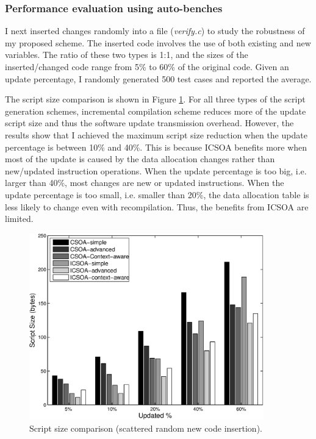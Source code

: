 \subsubsection{Performance evaluation using auto-benches}
I next inserted changes randomly into a file ({\em verify.c}) to study the robustness of my proposed scheme. The inserted code involves the use of both existing and new variables. The ratio of these two types is 1:1, and the sizes of the inserted/changed code range from 5\% to 60\% of the original code. Given an update percentage, I randomly generated 500 test cases and reported the average.

The script size comparison is shown in Figure \ref{upd_rand_bar}. For all three types of the script generation schemes, incremental compilation scheme reduces more of the
update script size and thus the software update transmission overhead. However, the results show that I achieved the maximum script size reduction when the update percentage is between 10\% and 40\%. This is because ICSOA benefits more when most of the update is caused by the data allocation changes rather than new/updated instruction operations. When the update percentage is too big, i.e. larger than 40\%, most changes are new or updated instructions. When the update percentage is too small, i.e. smaller than 20\%, the data allocation table is less likely to change even with recompilation. Thus, the benefits from ICSOA are limited.


\begin{figure}[htbp]
\begin{center}
\includegraphics[width=4in]{./figures/upd_rand_bar.eps}
\caption{Script size comparison (scattered random new code insertion).}
\label{upd_rand_bar}
\end{center}
\vspace{-0.2in}
\end{figure}

